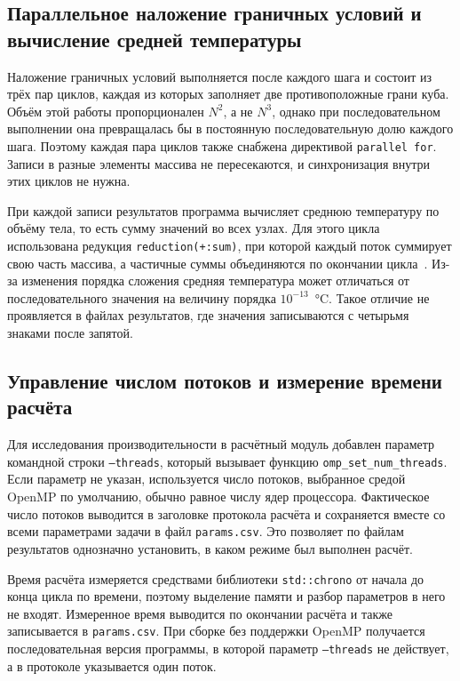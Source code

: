 \subsection{Параллельное наложение граничных условий и вычисление средней температуры}

Наложение граничных условий выполняется после каждого шага и состоит из трёх пар циклов, каждая из которых заполняет две противоположные грани куба. Объём этой работы пропорционален $N^2$, а не $N^3$, однако при последовательном выполнении она превращалась бы в постоянную последовательную долю каждого шага. Поэтому каждая пара циклов также снабжена директивой \texttt{parallel for}. Записи в разные элементы массива не пересекаются, и синхронизация внутри этих циклов не нужна.

При каждой записи результатов программа вычисляет среднюю температуру по объёму тела, то есть сумму значений во всех узлах. Для этого цикла использована редукция \texttt{reduction(+:sum)}, при которой каждый поток суммирует свою часть массива, а частичные суммы объединяются по окончании цикла~\cite{chandra2001parallel}. Из-за изменения порядка сложения средняя температура может отличаться от последовательного значения на величину порядка $10^{-13}$~°C. Такое отличие не проявляется в файлах результатов, где значения записываются с четырьмя знаками после запятой.

\subsection{Управление числом потоков и измерение времени расчёта}

Для исследования производительности в расчётный модуль добавлен параметр командной строки \texttt{--threads}, который вызывает функцию \texttt{omp\_set\_num\_threads}. Если параметр не указан, используется число потоков, выбранное средой OpenMP по умолчанию, обычно равное числу ядер процессора. Фактическое число потоков выводится в заголовке протокола расчёта и сохраняется вместе со всеми параметрами задачи в файл \texttt{params.csv}. Это позволяет по файлам результатов однозначно установить, в каком режиме был выполнен расчёт.

Время расчёта измеряется средствами библиотеки \texttt{std::chrono} от начала до конца цикла по времени, поэтому выделение памяти и разбор параметров в него не входят. Измеренное время выводится по окончании расчёта и также записывается в \texttt{params.csv}. При сборке без поддержки OpenMP получается последовательная версия программы, в которой параметр \texttt{--threads} не действует, а в протоколе указывается один поток.

